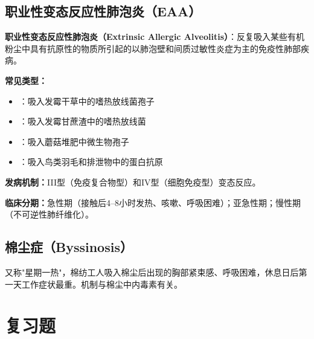 \begin{keybox}
\subsection{职业性变态反应性肺泡炎（EAA）}

\begin{defbox}
\textbf{职业性变态反应性肺泡炎（Extrinsic Allergic Alveolitis）}：反复吸入某些有机粉尘中具有抗原性的物质所引起的以肺泡壁和间质过敏性炎症为主的免疫性肺部疾病。
\end{defbox}

\textbf{常见类型：}
\begin{itemize}[leftmargin=*]
    \item {}：吸入发霉干草中的嗜热放线菌孢子
    \item {}：吸入发霉甘蔗渣中的嗜热放线菌
    \item {}：吸入蘑菇堆肥中微生物孢子
    \item {}：吸入鸟类羽毛和排泄物中的蛋白抗原
\end{itemize}

\textbf{发病机制：}III型（免疫复合物型）和IV型（细胞免疫型）变态反应。

\textbf{临床分期：}急性期（接触后4--8小时发热、咳嗽、呼吸困难）；亚急性期；慢性期（不可逆性肺纤维化）。

\subsection{棉尘症（Byssinosis）}

又称"星期一热"，棉纺工人吸入棉尘后出现的胸部紧束感、呼吸困难，休息日后第一天工作症状最重。机制与棉尘中内毒素有关。
\end{keybox}

\section{复习题}


